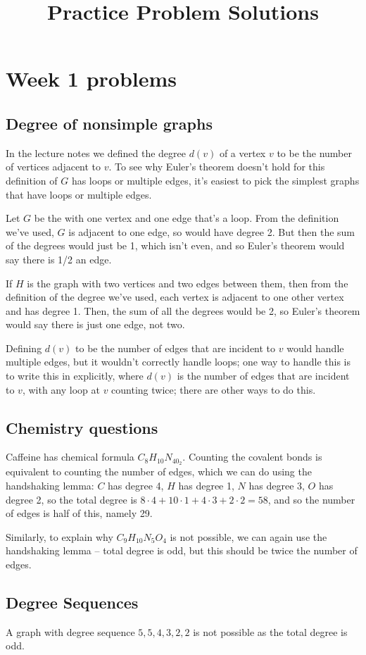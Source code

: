 \documentclass{amsart}
\title{Practice Problem Solutions}
\begin{document}
\section{Week 1 problems}

\subsection{Degree of nonsimple graphs}
In the lecture notes we defined the degree $d(v)$ of a vertex $v$ to be the number of vertices adjacent to $v$.  To see why Euler's theorem doesn't hold for this definition of $G$ has loops or multiple edges, it's easiest to pick the simplest graphs that have loops or multiple edges.

Let $G$ be the with one vertex and one edge that's a loop.  From the definition we've used, $G$ is adjacent to one edge, so would have degree 2.  But then the sum of the degrees would just be 1, which isn't even, and so Euler's theorem would say there is 1/2 an edge.

If $H$ is the graph with two vertices and two edges between them, then from the definition of the degree we've used, each vertex is adjacent to one other vertex and has degree 1.  Then, the sum of all the degrees would be 2, so Euler's theorem would say there is just one edge, not two.

Defining $d(v)$ to be the number of edges that are incident to $v$ would handle multiple edges, but it wouldn't correctly handle loops; one way to handle this is to write this in explicitly, where $d(v)$ is the number of edges that are incident to $v$, with any loop at $v$ counting twice; there are other ways to do this.

\subsection{Chemistry questions}
Caffeine has chemical formula $C_8H_{10}N_40_2$.  Counting the covalent bonds is equivalent to counting the number of edges, which we can do using the handshaking lemma: $C$ has degree 4, $H$ has degree 1, $N$ has degree 3, $O$ has degree 2, so the total degree is $8\cdot 4+10\cdot 1 + 4\cdot 3 + 2\cdot 2=58$, and so the number of edges is half of this, namely 29.

Similarly, to explain why $C_9H_{10}N_5O_4$ is not possible, we can again use the handshaking lemma -- total degree is odd, but this should be twice the number of edges.

\subsection{Degree Sequences}
A graph with degree sequence $5,5,4,3,2,2$ is not possible as the total degree is odd.
\end{document}
